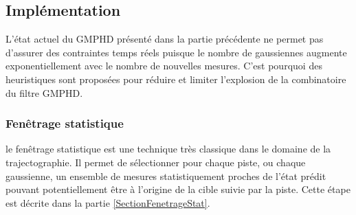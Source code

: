 \documentclass[10pt,french,a4paper]{report}
\begin{document}
%
%  
%

 \subsection{Implémentation}
 
 L'état actuel du \ac{GMPHD} présenté dans la partie précédente ne permet pas d'assurer des contraintes temps réels puisque le nombre de gaussiennes augmente exponentiellement avec le nombre de nouvelles mesures. C'est pourquoi des heuristiques sont proposées pour réduire et limiter l'explosion de la combinatoire du filtre \ac{GMPHD}.  
 
 \subsubsection{Fenêtrage statistique}
 le fenêtrage statistique est une technique très classique dans le domaine de la trajectographie. Il permet de sélectionner pour chaque piste, ou chaque gaussienne, un ensemble de mesures statistiquement proches de l'état prédit pouvant potentiellement être à l'origine de la cible suivie par la piste. Cette étape est décrite dans la partie \ref{SectionFenetrageStat}.
  
\end{document}
